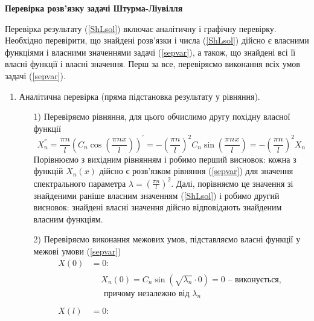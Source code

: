 \begin{center}
    \large{\textbf{Перевірка розв'язку задачі Штурма-Ліувілля}}
\end{center}

\noindent Перевірка результату (\ref{ShLsol}) включає аналітичну і графічну перевірку. Необхідно перевірити, що знайдені розв'язки і числа (\ref{ShLsol}) дійсно є власними функціями і власними значеннями задачі (\ref{sepvar}), а також, що знайдені всі її власні функції і власні значення. Перш за все, перевіряємо виконання всіх умов задачі (\ref{sepvar}).
\begin{enumerate}[wide, labelindent=0pt]
    \item Аналітична перевірка (пряма підстановка результату у рівняння).
    \begin{enumerate}
        \item[1)] Перевіряємо рівняння, для цього обчислимо другу похідну власної функції 
        \begin{equation*}
            X_n^{''} = \frac{\pi n}{l} \left(C_n\cos\left(\frac{\pi n x}{l}\right)\right)^{'} = -\left(\frac{\pi n}{l}\right)^2 C_n\sin\left(\frac{\pi n x}{l}\right) = -\left(\frac{\pi n}{l}\right)^2 X_n
        \end{equation*}
        Порівнюємо з вихідним рівнянням і робимо перший висновок: кожна з функцій $X_n(x)$ дійсно є розв’язком рівняння (\ref{sepvar}) для значення спектрального параметра $\lambda = \left(\frac{\pi n}{l}\right)^2$. Далі, порівняємо це значення зі знайденими раніше власним значенням (\ref{ShLsol}) і робимо другий висновок: знайдені власні значення дійсно відповідають знайденим власним функціям.
        \item[2)] Перевіряємо виконання межових умов, підставляємо власні функції у межові умови (\ref{sepvar}) 
        \begin{equation*}
            \begin{aligned}
                X(0) &=  0:\\
                &\begin{aligned}
                    &X_n(0) = C_n \sin(\sqrt{\lambda_n} \cdot 0) = 0 \text{ -- виконується,}\\
                    &\text{ причому незалежно від }\lambda_n
                \end{aligned}\\
                \\
                X(l) &= 0:\\
                &\begin{aligned}

\end{aligned}
\end{aligned}
\end{equation*}
\end{enumerate}
\end{enumerate}
